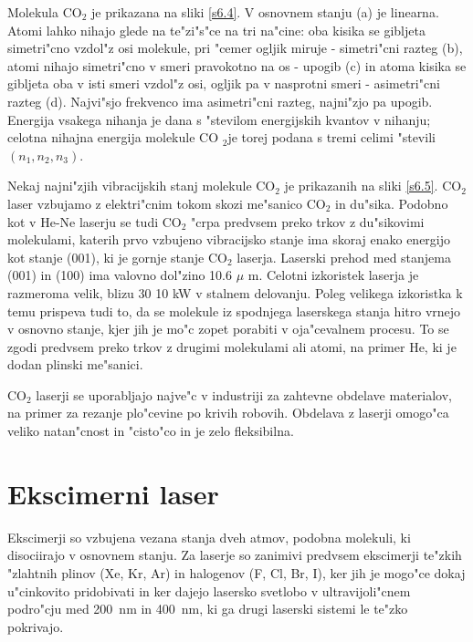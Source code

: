 Molekula CO$_2$ je prikazana na sliki \ref{s6.4}. V osnovnem stanju (a) je
linearna. Atomi lahko nihajo glede na te"zi"s"ce na tri na"cine: oba kisika
se gibljeta simetri"cno vzdol"z osi molekule, pri "cemer ogljik miruje -
simetri"cni razteg (b), atomi nihajo simetri"cno v smeri pravokotno na os -
upogib (c) in atoma kisika se gibljeta oba v isti smeri vzdol"z osi, ogljik
pa v nasprotni smeri - asimetri"cni razteg (d). Najvi"sjo frekvenco ima
asimetri"cni razteg, najni"zjo pa upogib. Energija vsakega nihanja je dana s
"stevilom energijskih kvantov v nihanju; celotna nihajna energija molekule CO%
$_2$je torej podana s tremi celimi "stevili $(n_1,n_2,n_3)$.

Nekaj najni"zjih vibracijskih stanj molekule CO$_2$ je prikazanih na sliki 
\ref{s6.5}. CO$_2$ laser vzbujamo z elektri"cnim tokom skozi me"sanico CO$_2$
in du"sika. Podobno kot v He-Ne laserju se tudi CO$_2$ "crpa predvsem preko
trkov z du"sikovimi molekulami, katerih prvo vzbujeno vibracijsko stanje ima
skoraj enako energijo kot stanje (001), ki je gornje stanje CO$_2$ laserja.
Laserski prehod med stanjema (001) in (100) ima valovno dol"zino 10.6 $\mu$%
m. Celotni izkoristek laserja je razmeroma velik, blizu 30%
10 kW v stalnem delovanju. Poleg velikega izkoristka k temu prispeva tudi
to, da se molekule iz spodnjega laserskega stanja hitro vrnejo v osnovno
stanje, kjer jih je mo"c zopet porabiti v oja"cevalnem procesu. To se zgodi
predvsem preko trkov z drugimi molekulami ali atomi, na primer He, ki je
dodan plinski me"sanici.

CO$_2$ laserji se uporabljajo najve"c v industriji za zahtevne obdelave
materialov, na primer za rezanje plo"cevine po krivih robovih. Obdelava z
laserji omogo"ca veliko natan"cnost in "cisto"co in je zelo fleksibilna.

\section{Ekscimerni laser}

Ekscimerji so vzbujena vezana stanja dveh atmov, podobna molekuli, ki
disociirajo v osnovnem stanju. Za laserje so zanimivi predvsem ekscimerji
te"zkih "zlahtnih plinov (Xe, Kr, Ar) in halogenov (F, Cl, Br, I), ker jih
je mogo"ce dokaj u"cinkovito pridobivati in ker dajejo lasersko svetlobo v
ultravijoli"cnem podro"cju med 200~nm in 400~nm, ki ga drugi laserski
sistemi le te"zko pokrivajo.

